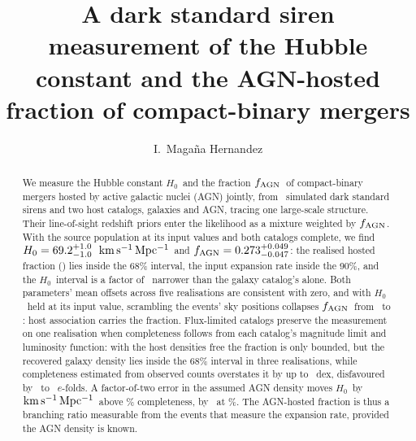 \documentclass[twocolumn]{aastex631}
\newcommand{\kmsmpc}{\ensuremath{{\rm km\,s^{-1}\,Mpc^{-1}}}}
\newcommand{\Hz}{\ensuremath{H_0}}
\newcommand{\fagn}{\ensuremath{f_{\rm AGN}}}
\begin{document}
\title{A dark standard siren measurement of the Hubble constant and the
AGN-hosted fraction of compact-binary mergers}

\author{I.~Maga\~na Hernandez}

\begin{abstract}
We measure the Hubble constant \Hz\ and the fraction \fagn\ of compact-binary
mergers hosted by active galactic nuclei (AGN) jointly, from \EvNobs\ simulated
dark standard sirens and two host catalogs, galaxies and AGN, tracing one
large-scale structure. Their line-of-sight redshift priors enter the
likelihood as a mixture weighted by \fagn. With the source population at
its input values and both catalogs complete, we find
$\Hz = \HzeroJoint$~\kmsmpc\ and $\fagn = \FagnJoint$: the realised hosted
fraction (\FagnTruthReal) lies inside the 68\% interval, the input expansion
rate inside the 90\%, and the \Hz\ interval is a factor of
\HzeroWidthRatio\ narrower than the galaxy catalog's alone. Both parameters'
mean offsets across five realisations are consistent with zero, and with
\Hz\ held at its input value, scrambling the events' sky positions collapses
\fagn\ from \FagnRecord\ to \FagnNull: host association carries the
fraction. Flux-limited catalogs preserve the measurement on one realisation
when completeness follows from each catalog's magnitude limit and luminosity
function: with the host densities free the fraction is only bounded, but the
recovered galaxy density lies inside the 68\%
interval in three realisations, while completeness estimated from observed
counts overstates it by up to \PixelAnchorBiasMaxDex~dex, disfavoured by
\SeedLnBFmin\ to \SeedLnBFmax\ $e$-folds. A factor-of-two error in the assumed AGN density moves \Hz\ by
\HzDensityShiftFactorTwoDeep~\kmsmpc\ above \CompMTwenty\%
completeness, by \HzDensityShiftFactorTwo\ at \CompMEighteen\%. The AGN-hosted fraction is thus a branching ratio
measurable from the events that measure the expansion rate, provided the AGN
density is known.
\end{abstract}

\end{document}
